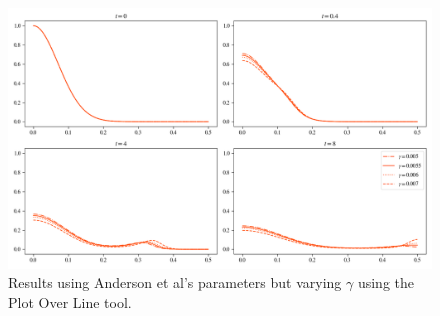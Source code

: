 \begin{figure}[h]
    \centering
    \includegraphics[width=\textwidth]{resources/images/gamma_comparison.png}
    \caption{Results using Anderson et al's parameters but varying $\gamma$ using the Plot Over Line tool.}
    \label{fig:replication_gamma_comparison}
\end{figure}



